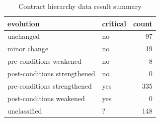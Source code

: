 \begin{table}[]
\centering
\caption{Contract hierarchy data result summary}
\label{tab:results-hierarchy}
\begin{tabular}{|l|l|r|} \hline
   evolution & critical & count \\ \hline
   unchanged & no & 97  \\
   minor change & no & 19  \\
   pre-conditions weakened & no & 8  \\
   post-conditions strengthened & no & 0  \\ \hline
   pre-conditions strengthened & yes & 335  \\
   post-conditions weakened & yes & 0  \\ \hline
   unclassified & ? & 148  \\ \hline
\end{tabular}
\end{table}
